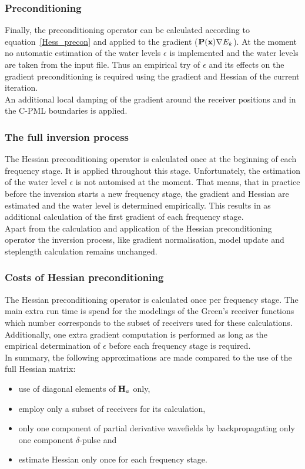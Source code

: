 \subsubsection*{Preconditioning}
Finally, the preconditioning operator can be calculated according to equation~\ref{Hess_precon} and applied to the gradient ($\textbf P(\textbf x) \nabla E_k$). At the moment no automatic estimation of the water levels $\epsilon$ is implemented and the water levels are taken from the input file. Thus an empirical try of $\epsilon$ and its effects on the gradient preconditioning is required using the gradient and Hessian of the current iteration.\\
An additional local damping of the gradient around the receiver positions and in the C-PML boundaries is applied.
\subsubsection*{The full inversion process}
The Hessian preconditioning operator is calculated once at the beginning of each frequency stage. It is applied throughout this stage. Unfortunately, the estimation of the water level $\epsilon$ is not automised at the moment. That means, that in practice before the inversion starts a new frequency stage, the gradient and Hessian are estimated and the water level is determined empirically. This results in as additional calculation of the first gradient of each frequency stage.\\
Apart from the calculation and application of the Hessian preconditioning operator the inversion process, like gradient normalisation, model update and steplength calculation remains unchanged. 
\subsubsection*{Costs of Hessian preconditioning}
The Hessian preconditioning operator is calculated once per frequency stage. The main extra run time is spend for the modelings of the Green's receiver functions which number corresponds to the subset of receivers used for these calculations. Additionally, one extra gradient computation is performed as long as the empirical determination of $\epsilon$ before each frequency stage is required.\\
In summary, the following approximations are made compared to the use of the full Hessian matrix:
\begin{itemize}
 \item use of diagonal elements of $\textbf H_a$ only,
\item employ only a subset of receivers for its calculation,
\item only one component of partial derivative wavefields by  backpropagating only one component $\delta$-pulse and
\item estimate Hessian only once for each frequency stage.
\end{itemize}


